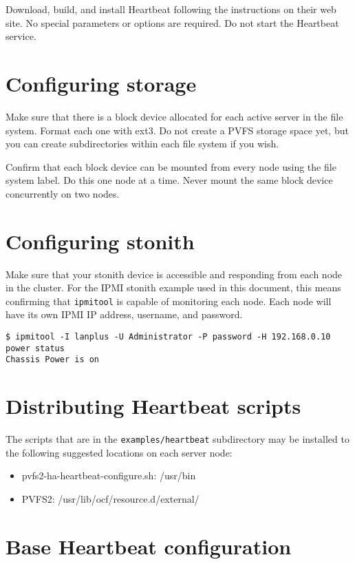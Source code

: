 \documentclass[11pt]{article}
\begin{document}
Download, build, and install Heartbeat following the instructions on
their web site.  No special parameters or options are required.  Do not
start the Heartbeat service.

\section{Configuring storage}

Make sure that there is a block device allocated for each active server
in the file system.  Format each one with ext3.  Do not create a PVFS
storage space yet, but you can create subdirectories within each file
system if you wish.

Confirm that each block device can be mounted from every node using the
file system label.  Do this one node at a time.  Never mount
the same block device concurrently on two nodes.

\section{Configuring stonith}

Make sure that your stonith device is accessible and responding from each
node in the cluster.  For the IPMI stonith example used in this document,
this means confirming that \texttt{ipmitool} is capable of monitoring
each node.  Each node will have its own IPMI IP address, username, and
password.

\begin{verbatim}
$ ipmitool -I lanplus -U Administrator -P password -H 192.168.0.10 power status
Chassis Power is on
\end{verbatim}

\section{Distributing Heartbeat scripts}

The scripts that are in the \texttt{examples/heartbeat} subdirectory may be
installed to the following suggested locations on each server node:
\begin{itemize}
\item pvfs2-ha-heartbeat-configure.sh: /usr/bin
\item PVFS2: /usr/lib/ocf/resource.d/external/
\end{itemize}

\section{Base Heartbeat configuration}
\end{document}
